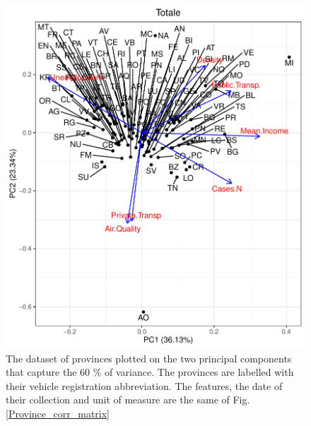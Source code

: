 \documentclass[
12pt, %
a4paper, %
oneside, %
headinclude,footinclude, %
BCOR5mm, %
]{scrartcl}
\begin{document}
\begin{figure}[h]
\begin{center}
\includegraphics[scale=1]{Pic/Provinces_PCA_FULL.pdf}
\caption{The dataset of provinces plotted on the two principal components that capture the 60 $\% $ of variance. The provinces are labelled with their vehicle registration abbreviation. The features, the date of their collection and unit of measure are the same of Fig. \ref{Province_corr_matrix} }
\end{center}
\end{figure}









\clearpage


\renewcommand{\refname}{\spacedlowsmallcaps{References}} %




\end{document}
